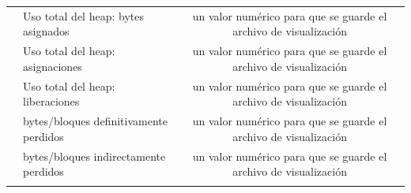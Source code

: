 \begin{table}[H]
\begin{tabular}{lm{4.7cm}m{0.60\linewidth}c}
		                                      & \centering Uso total del heap: bytes asignados     & un valor numérico para que se guarde el archivo de visualización                                          \\
		                                      & \centering Uso total del heap: asignaciones        & un valor numérico para que se guarde el archivo de visualización                                          \\
		                                      & \centering Uso total del heap: liberaciones        & un valor numérico para que se guarde el archivo de visualización                                          \\
		                                      & \centering bytes/bloques definitivamente perdidos  & un valor numérico para que se guarde el archivo de visualización                                          \\
		                                      & \centering bytes/bloques indirectamente perdidos   & un valor numérico para que se guarde el archivo de visualización                                          \\
		\\ \hline
	\end{tabular}
	\vspace{-4mm}
\end{table}

